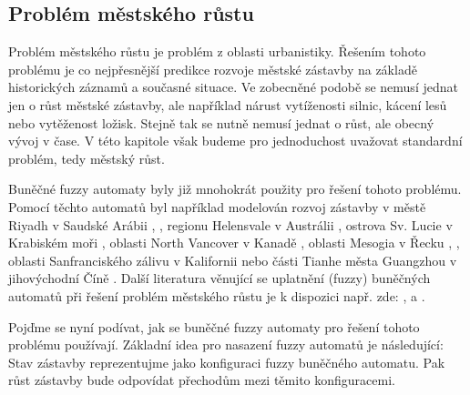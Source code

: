 \documentclass[a4paper,10pt]{article}
\begin{document}
\subsection{Problém městského růstu}
Problém městského růstu je problém z oblasti urbanistiky. Řešením tohoto problému je co nejpřesnější predikce rozvoje městské zástavby na základě historických záznamů a současné situace. Ve zobecněné podobě se nemusí jednat jen o růst městské zástavby, ale například nárust vytíženosti silnic, kácení lesů nebo vytěženost ložisk. Stejně tak se nutně nemusí jednat o růst, ale obecný vývoj v čase. V této kapitole však budeme pro jednoduchost uvažovat standardní problém, tedy městský růst.

Buněčné fuzzy automaty byly již mnohokrát použity pro řešení tohoto problému. Pomocí těchto automatů byl například modelován rozvoj zástavby v městě Riyadh v Saudské Arábii \cite{AlAhHep+-ModUrbGroDynUsCelAutGIS}, \cite{Ahm+-CalFuzCelAutModUrbDynSauAr}, regionu Helensvale v Austrálii \cite{War+-StoConCelModUrbGro}, ostrova Sv. Lucie v Krabiském moři \cite{WhiEng-CelAutBasIntDynRegMod}, oblasti North Vancover v Kanadě \cite{LaiDraSch-IntMulEvCelAutMetLanSimMod}, oblasti Mesogia v Řecku \cite{ManHatPra-FuzCelAutBasSheModUrGro+}, \cite{ManHatPra-ModUrbGroUsFuzCelAut}, oblasti Sanfranciského zálivu v Kalifornii \cite{ClaHopHay-SelModCelAutModHistUrbSanFraBayAre} nebo části Tianhe města Guangzhou v jihovýchodní Číně \cite{Wu-CalStoCelAutAppRurUrbLanConv}. %
%
Další literatura věnující se uplatnění (fuzzy) buněčných automatů při řešení problém městského růstu je k dispozici např. zde: \cite{PowSimWhi-HieFuzzPattMatcRegCompLanUseMap}, \cite{Dra-CouFuzSetTheGisBaCelAutLanUseChaMod} a \cite{LiuPhi-DevCelAutModUrbGroIncFuzSetApp}.


Pojďme se nyní podívat, jak se buněčné fuzzy automaty pro řešení tohoto problému používají. Základní idea pro nasazení fuzzy automatů je následující: Stav zástavby reprezentujme jako konfiguraci fuzzy buněčného automatu. Pak růst zástavby bude odpovídat přechodům mezi těmito konfiguracemi.
\end{document}

